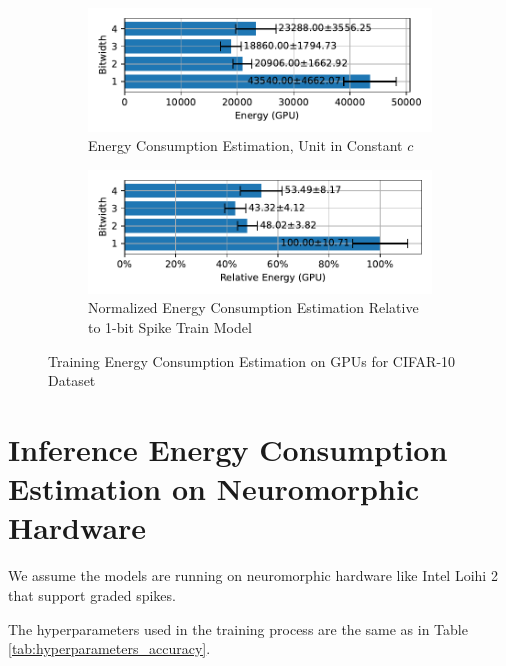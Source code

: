         \begin{figure}[H]
            \centering
            \begin{subfigure}[H]{0.6\textwidth}
                \includegraphics[width=\textwidth]{../standard/CIFAR10/plots/cifar10_train_energy_gpu_horizontal.pdf}
                \caption{Energy Consumption Estimation, Unit in Constant $c$}
            \end{subfigure}
            \hfill
            \begin{subfigure}[H]{0.6\textwidth}
                \includegraphics[width=\textwidth]{../standard/CIFAR10/plots/cifar10_train_relative_energy_gpu_horizontal.pdf}
                \caption{Normalized Energy Consumption Estimation Relative to 1-bit Spike Train Model}
            \end{subfigure}
            \caption{Training Energy Consumption Estimation on GPUs for CIFAR-10 Dataset}
        \end{figure}

\section{Inference Energy Consumption Estimation on Neuromorphic Hardware}
\label{appendix:energy_neuromorphic}

    We assume the models are running on neuromorphic hardware like Intel Loihi 2 that support graded spikes. 

    The hyperparameters used in the training process are the same as in Table \ref{tab:hyperparameters_accuracy}.

